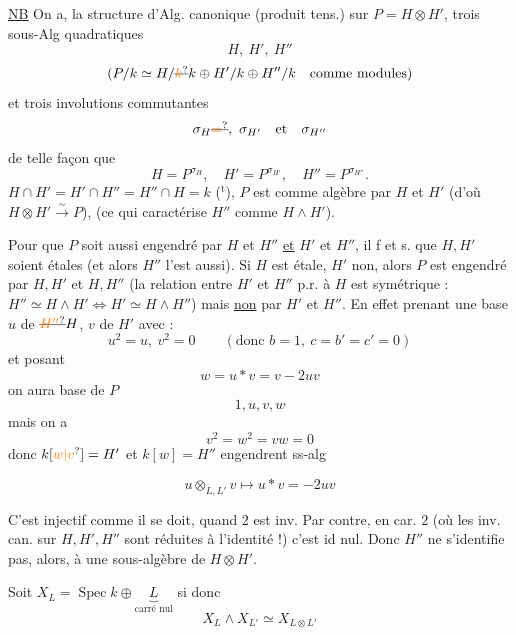 \uline{NB} On a,  la structure d'Alg.  canonique (produit tens.) sur $P=H\otimes H'$, trois sous-Alg quadratiques
\[
 H,\ H',\ H''
\]
\[
 (P/k\simeq H/\deleted{\unsure{k}}k\oplus H'/k\oplus H''/k\quad\text{comme modules})
\]
et trois involutions  commutantes
\[
 \sigma_H\deleted{\unsure{=}},\ \sigma_{H'}\quad\text{et}\quad\sigma_{H''}
\]
de telle façon que
\[
 H=P^{\sigma_H},\quad H'=P^{\sigma_{H'}},\quad H''=P^{\sigma_{H''}}.
\]
  $H\cap H'=H'\cap H''=H''\cap H=k$ ($^{\mathrm t}$),  $P$ est  comme algèbre par $H$ et $H'$ (d'où $H\otimes H'\overset{\sim}{\longrightarrow}P$),  (ce qui caractérise $H''$ comme $H\wedge H'$).

Pour que $P$ soit aussi engendré par $H$ et $H''$ \uline{et} $H'$ et $H''$, il f et s. que $H,H'$ soient étales (et alors $H''$ l'est aussi). Si $H$ est étale, $H'$ non,  alors $P$ est engendré par $H,H'$ et $H,H''$ (la relation entre $H'$ et $H''$ p.r. à $H$ est symétrique : $H''\simeq H\wedge H'\iff H'\simeq H\wedge H''$) mais \uline{non} par $H'$ et $H''$. En effet prenant une base $u$ de $\deleted{\unsure{H''}}H$, $v$ de $H'$ avec :
\[
 u^2=u,\ v^2=0\qquad(\text{donc }b=1,\ c=b'=c'=0)
\]
et posant
\[
 w=u\ast v=v-2uv
\]
on aura   base de $P$
\[
 1,u,v,w
\]
mais on a
\[
 v^2=w^2=vw=0
\]
donc $k[\unsure{w|v}]=H'$ et $k[w]=H''$ engendrent ss-alg

\[
 u\mathbin{\otimes_{L,L'}}v\longmapsto u\ast v=-2uv
\]

C'est  injectif comme il se doit, quand $2$ est inv. Par contre, en car. $2$  (où les inv. can. sur  $H,H',H''$ sont réduites à l'identité !) c'est id nul. Donc $H''$ ne s'identifie pas, alors, à une sous-algèbre de $H\otimes H'$.

Soit $X_L=\operatorname{Spec} k\oplus\underbrace{L}_{\text{carré nul}}$ si
donc
\[
 X_L\wedge X_{L'}\simeq X_{L\otimes L'}
\]

